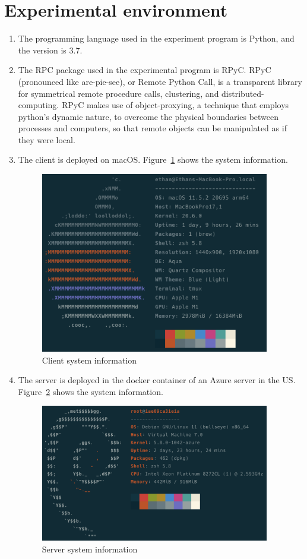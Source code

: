 \documentclass{article}
\begin{document}
\section{Experimental environment}\label{sec:experimental-environment}
\begin{enumerate}[label=(\alph*)]
  \item {
    The programming language used in the experiment program is Python, and the version is 3.7.
  }
  \item {
    The RPC package used in the experimental program is RPyC. RPyC (pronounced like are-pie-see), or Remote Python Call, is a transparent library for symmetrical remote procedure calls, clustering, and distributed-computing. RPyC makes use of object-proxying, a technique that employs python’s dynamic nature, to overcome the physical boundaries between processes and computers, so that remote objects can be manipulated as if they were local.
  }
  \item {
    The client is deployed on macOS. Figure~\ref{fig:client_sysinfo} shows the system information.
    \begin{figure}[htp]
        \centering
        \includegraphics[width=10cm]{client_sysinfo}
        \caption{Client system information}
        \label{fig:client_sysinfo}
    \end{figure}
  }
  \item {
    The server is deployed in the docker container of an Azure server in the US. Figure~\ref{fig:server_sysinfo} shows the system information.
    \begin{figure}[htp]
        \centering
        \includegraphics[width=10cm]{server_sysinfo}
        \caption{Server system information}
        \label{fig:server_sysinfo}
    \end{figure}
  }
\end{enumerate}
\end{document}
